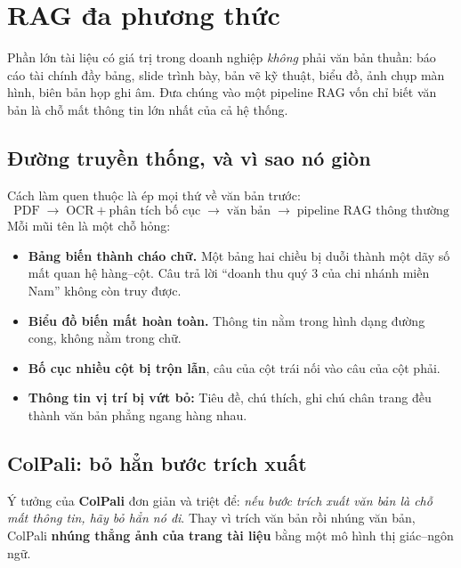 
\section{RAG đa phương thức}
\label{sec:multimodal_rag}

Phần lớn tài liệu có giá trị trong doanh nghiệp \emph{không} phải văn bản thuần: báo cáo tài chính đầy bảng, slide trình bày, bản vẽ kỹ thuật, biểu đồ, ảnh chụp màn hình, biên bản họp ghi âm. Đưa chúng vào một pipeline RAG vốn chỉ biết văn bản là chỗ mất thông tin lớn nhất của cả hệ thống.

\subsection{Đường truyền thống, và vì sao nó giòn}
\label{ssec:ocr_pipeline}

Cách làm quen thuộc là ép mọi thứ về văn bản trước:
\[
\text{PDF} \;\rightarrow\; \text{OCR} + \text{phân tích bố cục} \;\rightarrow\; \text{văn bản} \;\rightarrow\; \text{pipeline RAG thông thường}
\]
Mỗi mũi tên là một chỗ hỏng:
\begin{itemize}
	\item \textbf{Bảng biến thành cháo chữ.} Một bảng hai chiều bị duỗi thành một dãy số mất quan hệ hàng--cột. Câu trả lời “doanh thu quý 3 của chi nhánh miền Nam” không còn truy được.
	\item \textbf{Biểu đồ biến mất hoàn toàn.} Thông tin nằm trong hình dạng đường cong, không nằm trong chữ.
	\item \textbf{Bố cục nhiều cột bị trộn lẫn}, câu của cột trái nối vào câu của cột phải.
	\item \textbf{Thông tin vị trí bị vứt bỏ:} Tiêu đề, chú thích, ghi chú chân trang đều thành văn bản phẳng ngang hàng nhau.
\end{itemize}

\subsection{ColPali: bỏ hẳn bước trích xuất}
\label{ssec:colpali}

Ý tưởng của \textbf{ColPali} \cite{faysse2025colpali} đơn giản và triệt để: \emph{nếu bước trích xuất văn bản là chỗ mất thông tin, hãy bỏ hẳn nó đi}. Thay vì trích văn bản rồi nhúng văn bản, ColPali \textbf{nhúng thẳng ảnh của trang tài liệu} bằng một mô hình thị giác--ngôn ngữ.

